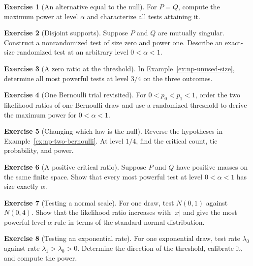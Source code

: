 \documentclass[11pt,oneside]{book}
\theoremstyle{definition}
\newtheorem{exercise}{Exercise}[section]
\theoremstyle{remark}
\begin{document}
\begin{exercise}[An alternative equal to the null]
\label{exer:np-identical-laws}
For $P=Q$, compute the maximum power at level $\alpha$ and
characterize all tests attaining it.
\end{exercise}

\begin{exercise}[Disjoint supports]
\label{exer:np-mutually-singular}
Suppose $P$ and $Q$ are mutually singular. Construct a
nonrandomized test of size zero and power one. Describe an
exact-size randomized test at an arbitrary level $0<\alpha<1$.
\end{exercise}

\begin{exercise}[A zero ratio at the threshold]
\label{exer:np-zero-threshold-condition}
In Example~\ref{ex:np-unused-size}, determine all most powerful
tests at level $3/4$ on the three outcomes.
\end{exercise}

\begin{exercise}[One Bernoulli trial revisited]
\label{exer:np-one-bit-ratio}
For $0<p_0<p_1<1$, order the two likelihood ratios of one
Bernoulli draw and use a randomized threshold to derive
the maximum power for $0<\alpha<1$.
\end{exercise}

\begin{exercise}[Changing which law is the null]
\label{exer:np-swap-null-alternative}
Reverse the hypotheses in Example~\ref{ex:np-two-bernoulli}.
At level $1/4$, find the critical count, tie probability, and power.
\end{exercise}

\begin{exercise}[A positive critical ratio]
\label{exer:np-positive-critical-ratio}
Suppose $P$ and $Q$ have positive masses on the same finite space.
Show that every most powerful test at level $0<\alpha<1$ has
size exactly $\alpha$.
\end{exercise}

\begin{exercise}[Testing a normal scale]
\label{exer:np-normal-scale}
For one draw, test $N(0,1)$ against $N(0,4)$. Show that the
likelihood ratio increases with $|x|$ and give the most powerful
level-$\alpha$ rule in terms of the standard normal distribution.
\end{exercise}

\begin{exercise}[Testing an exponential rate]
\label{exer:np-exponential-rate-simple}
For one exponential draw, test rate $\lambda_0$ against rate
$\lambda_1>\lambda_0>0$. Determine the direction of the
threshold, calibrate it, and compute the power.
\end{exercise}
\end{document}
